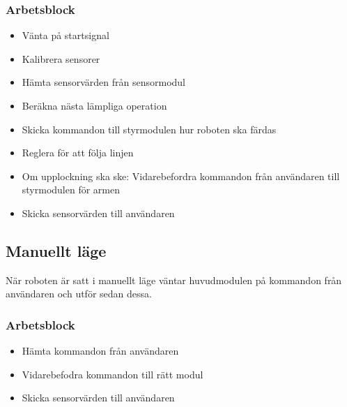\subsubsection{Arbetsblock}
\begin{itemize}
\item Vänta på startsignal
\item Kalibrera sensorer
\item Hämta sensorvärden från sensormodul
\item Beräkna nästa lämpliga operation
\item Skicka kommandon till styrmodulen hur roboten ska färdas
\item Reglera för att följa linjen
\item Om upplockning ska ske: 
\newline
Vidarebefordra kommandon från användaren till styrmodulen för armen
\item Skicka sensorvärden till användaren
\end{itemize}

\subsection{Manuellt läge}
När roboten är satt i manuellt läge väntar huvudmodulen på kommandon från användaren och utför sedan dessa. 
\subsubsection{Arbetsblock}
\begin{itemize}
\item Hämta kommandon från användaren
\item Vidarebefodra kommandon till rätt modul
\item Skicka sensorvärden till användaren
\end{itemize}